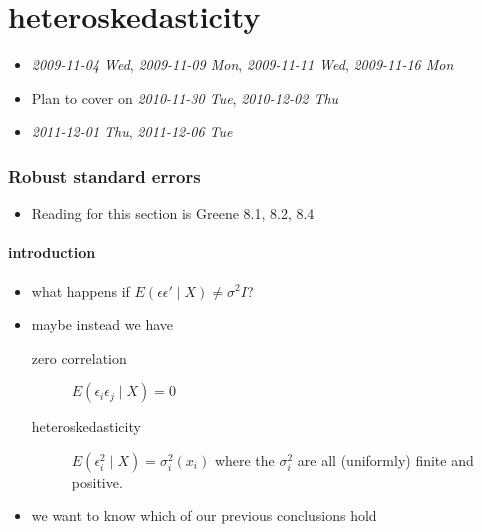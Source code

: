 
\part{heteroskedasticity}

\begin{itemize}
\item \textit{2009-11-04 Wed}, \textit{2009-11-09 Mon},  \textit{2009-11-11 Wed}, \textit{2009-11-16 Mon}
\item Plan to cover on \textit{2010-11-30 Tue}, \textit{2010-12-02 Thu}
\item \textit{2011-12-01 Thu}, \textit{2011-12-06 Tue}
\end{itemize}
\section{Robust standard errors}
\label{sec-1}

\begin{itemize}
\item Reading for this section is Greene 8.1, 8.2, 8.4
\end{itemize}
\subsection{introduction}
\label{sec-1-1}

\begin{itemize}
\item what happens if $E(\epsilon \epsilon' \mid X) \neq \sigma^2 I$?
\item maybe instead we have
\begin{description}
\item[zero correlation] $E(\epsilon_i \epsilon_j \mid X) = 0$
\item[heteroskedasticity] $E(\epsilon_i^2 \mid X) =
            \sigma_i^2(x_i)$ where the $\sigma_i^2$ are all
            (uniformly) finite and positive.
\end{description}
\item we want to know which of our previous conclusions hold
\end{itemize}
